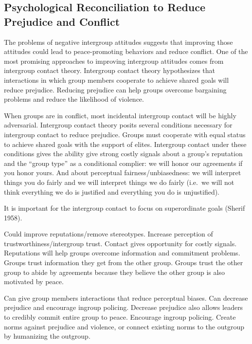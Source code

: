 \documentclass[11pt]{article}
\begin{document}
\subsection{Psychological Reconciliation to Reduce Prejudice and
Conflict}\label{psychological-reconciliation-to-reduce-prejudice-and-conflict}

The problems of negative intergroup attitudes suggests that improving
those attitudes could lead to peace-promoting behaviors and reduce
conflict. One of the most promising approaches to improving intergroup
attitudes comes from intergroup contact theory. Intergroup contact
theory hypothesizes that interactions in which group members cooperate
to achieve shared goals will reduce prejudice. Reducing prejudice can
help groups overcome bargaining problems and reduce the likelihood of
violence.

When groups are in conflict, most incidental intergroup contact will be
highly adversarial. Intergroup contact theory posits several conditions
necessary for intergroup contact to reduce prejudice. Groups must
cooperate with equal status to achieve shared goals with the support of
elites. Intergroup contact under these conditions gives the ability give
strong costly signals about a group's reputation and the ``group type''
as a conditional complier: we will honor our agreements if you honor
yours. And about perceptual fairness/unbiasedness: we will interpret
things you do fairly and we will interpret things we do fairly (i.e.~we
will not think everything we do is justified and everything you do is
unjustified).

It is important for the intergroup contact to focus on superordinate
goals (Sherif 1958).

Could improve reputations/remove stereotypes. Increase perception of
trustworthiness/intergroup trust. Contact gives opportunity for costly
signals. Reputations will help groups overcome information and
commitment problems. Groups trust information they get from the other
group. Groups trust the other group to abide by agreements because they
believe the other group is also motivated by peace.

Can give group members interactions that reduce perceptual biases. Can
decrease prejudice and encourage ingroup policing. Decrease prejudice
also allows leaders to credibly commit entire group to peace. Encourage
ingroup policing. Create norms against prejudice and violence, or
connect existing norms to the outgroup by humanizing the outgroup.
\end{document}
